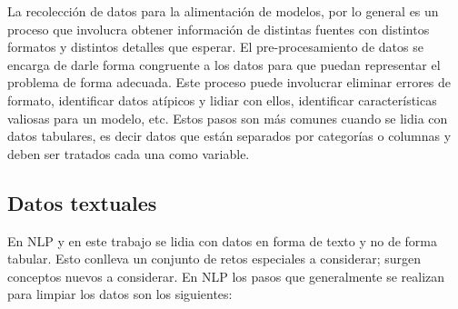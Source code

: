 La recolección de datos para la alimentación de modelos, por lo general es un proceso que involucra obtener información de distintas fuentes con distintos formatos y distintos detalles que esperar. El pre-procesamiento de datos se encarga de darle forma congruente a los datos para que puedan representar el problema de forma adecuada. Este proceso puede involucrar eliminar errores de formato, identificar datos atípicos y lidiar con ellos, identificar características valiosas para un modelo, etc. Estos pasos son más comunes cuando se lidia con datos tabulares, es decir datos que están separados por categorías o columnas y deben ser tratados cada una como variable.

\subsection{Datos textuales}

En NLP y en este trabajo se lidia con datos en forma de texto y no de forma tabular. Esto conlleva un conjunto de retos especiales a considerar; surgen conceptos nuevos a considerar. En NLP los pasos que generalmente se realizan para limpiar los datos son los siguientes:


